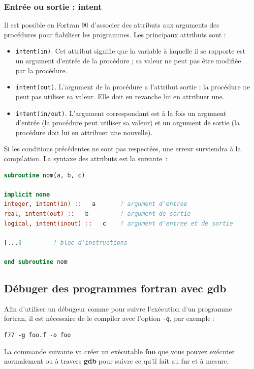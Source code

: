 \documentclass[a4paper,twoside]{article}
\begin{document}
\subsubsection{Entrée ou sortie : intent}

Il est possible en Fortran 90 d'associer des attributs aux arguments des procédures pour fiabiliser les programmes. Les principaux attributs sont : 
\begin{itemize}
\item  \texttt{intent(in)}. Cet attribut signifie que la variable à laquelle il se rapporte est un argument d'entrée de la procédure ; sa valeur ne peut pas être modifiée par la procédure. 

\item  \texttt{intent(out)}. L'argument de la procédure a l'attribut sortie ; la procédure ne peut pas utiliser sa valeur. Elle doit en revanche lui en attribuer une.

\item  \texttt{intent(in/out)}. L'argument correspondant est à la fois un argument d'entrée (la procédure peut utiliser sa valeur) et un argument de sortie (la procédure doit lui en attribuer une nouvelle). 
\end{itemize}
Si les conditions précédentes ne sont pas respectées, une erreur surviendra à la compilation. La syntaxe des attributs est la suivante~: 
\begin{lstlisting}[language=Fortran]
subroutine nom(a, b, c)
 
implicit none         
integer, intent(in) ::   a       ! argument d'entree 
real, intent(out) ::   b         ! argument de sortie 
logical, intent(inout) ::   c    ! argument d'entree et de sortie
 
[...]         ! bloc d'instructions
 
end subroutine nom 
\end{lstlisting}

\subsection{Débuger des programmes fortran avec gdb}
Afin d'utiliser un débugeur comme  pour suivre l'exécution d'un programme fortran, il est nécessaire de le compiler avec l'option \texttt{-g}, par exemple : 
\begin{verbatim}
f77 -g foo.f -o foo
\end{verbatim}
La commande suivante va créer un exécutable \textbf{foo} que vous pouvez exécuter normalement ou à travers \textbf{gdb} pour suivre ce qu'il fait au fur et à mesure.
\end{document}
